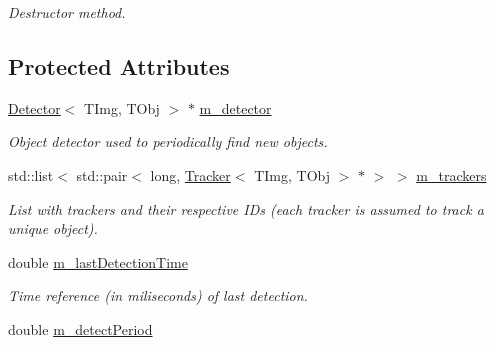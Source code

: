 \begin{DoxyCompactItemize}
\begin{DoxyCompactList}\small\item\em Destructor method. \end{DoxyCompactList}\end{DoxyCompactItemize}
\subsection*{Protected Attributes}
\begin{DoxyCompactItemize}
\item 
\hypertarget{class_vision_core_1_1_abstractions_1_1_abstract_auto_tracker_a5e56e46f08984f7e62a33e0bf4bb057d}{}\hyperlink{class_vision_core_1_1_interfaces_1_1_detector}{Detector}$<$ T\+Img, T\+Obj $>$ $\ast$ \hyperlink{class_vision_core_1_1_abstractions_1_1_abstract_auto_tracker_a5e56e46f08984f7e62a33e0bf4bb057d}{m\+\_\+detector}\label{class_vision_core_1_1_abstractions_1_1_abstract_auto_tracker_a5e56e46f08984f7e62a33e0bf4bb057d}

\begin{DoxyCompactList}\small\item\em Object detector used to periodically find new objects. \end{DoxyCompactList}\item 
\hypertarget{class_vision_core_1_1_abstractions_1_1_abstract_auto_tracker_a6e6d6b320c1ead138321166ebb40faac}{}std\+::list$<$ std\+::pair$<$ long, \hyperlink{class_vision_core_1_1_interfaces_1_1_tracker}{Tracker}$<$ T\+Img, T\+Obj $>$ $\ast$ $>$ $>$ \hyperlink{class_vision_core_1_1_abstractions_1_1_abstract_auto_tracker_a6e6d6b320c1ead138321166ebb40faac}{m\+\_\+trackers}\label{class_vision_core_1_1_abstractions_1_1_abstract_auto_tracker_a6e6d6b320c1ead138321166ebb40faac}

\begin{DoxyCompactList}\small\item\em List with trackers and their respective I\+Ds (each tracker is assumed to track a unique object). \end{DoxyCompactList}\item 
\hypertarget{class_vision_core_1_1_abstractions_1_1_abstract_auto_tracker_a0a11a9660666ac4410b2e9590d949222}{}double \hyperlink{class_vision_core_1_1_abstractions_1_1_abstract_auto_tracker_a0a11a9660666ac4410b2e9590d949222}{m\+\_\+last\+Detection\+Time}\label{class_vision_core_1_1_abstractions_1_1_abstract_auto_tracker_a0a11a9660666ac4410b2e9590d949222}

\begin{DoxyCompactList}\small\item\em Time reference (in miliseconds) of last detection. \end{DoxyCompactList}\item 
\hypertarget{class_vision_core_1_1_abstractions_1_1_abstract_auto_tracker_a3744969d6f149aca80a8bd6e89be02d1}{}double \hyperlink{class_vision_core_1_1_abstractions_1_1_abstract_auto_tracker_a3744969d6f149aca80a8bd6e89be02d1}{m\+\_\+detect\+Period}\label{class_vision_core_1_1_abstractions_1_1_abstract_auto_tracker_a3744969d6f149aca80a8bd6e89be02d1}


\end{DoxyCompactItemize}
